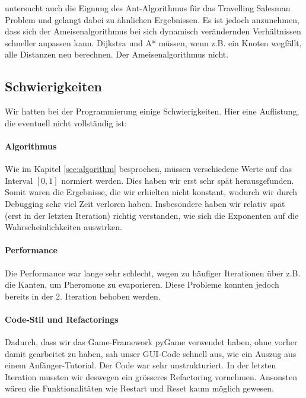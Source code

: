 \citeauthor*{leo-perf} untersucht auch die Eignung des Ant-Algorithmus für das
Travelling Salesman Problem und gelangt dabei zu ähnlichen Ergebnissen. Es ist
jedoch anzunehmen, dass sich der Ameisenalgorithmus bei sich dynamisch
verändernden Verhältnissen schneller anpassen kann. Dijkstra und A* müssen, wenn
z.B. ein Knoten wegfällt, alle Distanzen neu berechnen. Der Ameisenalgorithmus
nicht.

\subsection{Schwierigkeiten}

Wir hatten bei der Programmierung einige Schwierigkeiten. Hier eine Auflistung,
die eventuell nicht vollständig ist:

\paragraph*{Algorithmus}

Wie im Kapitel \ref{sec:algorithm} besprochen, müssen verschiedene Werte auf das
Interval $[0,1]$ normiert werden. Dies haben wir erst sehr spät herausgefunden.
Somit waren die Ergebnisse, die wir erhielten nicht konstant, wodurch wir durch
Debugging sehr viel Zeit verloren haben. Insbesondere haben wir relativ spät
(erst in der letzten Iteration) richtig verstanden, wie sich die Exponenten auf
die Wahrscheinlichkeiten auswirken.

\paragraph*{Performance}

Die Performance war lange sehr schlecht, wegen zu häufiger Iterationen über z.B.
die Kanten, um Pheromone zu evaporieren. Diese Probleme konnten jedoch bereits
in der 2. Iteration behoben werden.

\paragraph*{Code-Stil und Refactorings}

Dadurch, dass wir das Game-Framework pyGame verwendet haben, ohne vorher damit
gearbeitet zu haben, sah unser GUI-Code schnell aus, wie ein Auszug aus einem
Anfänger-Tutorial. Der Code war sehr unstrukturiert. In der letzten Iteration
mussten wir deswegen ein grösseres Refactoring vornehmen. Ansonsten wären die
Funktionalitäten wie Restart und Reset kaum möglich gewesen.